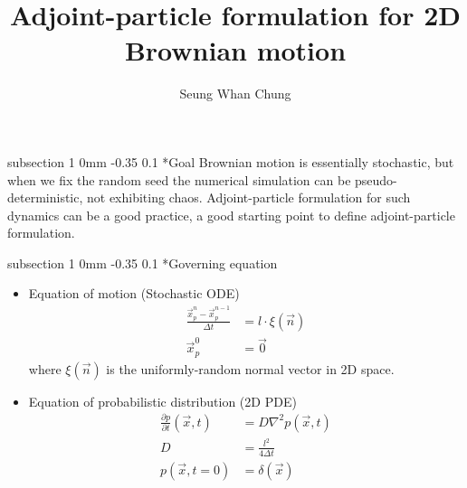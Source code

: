 \documentclass[11pt]{article}
\title{Adjoint-particle formulation for 2D Brownian motion}
\author{Seung Whan Chung}
\makeatletter
\renewcommand{\subsection}{\@startsection
{subsection}%
{1}%
{0mm}%
{-0.35\baselineskip}%
{0.1\baselineskip}%
{\normalfont\large\bfseries\color{brown}}}%
\def\Dpartial#1#2{ \frac{\partial #1}{\partial #2} }
\newcommand{\vn}{\vec{n}}
\newcommand{\vx}{\vec{x}}
\newcommand{\xp}{\vec{x}_p}
\newcommand{\Dt}{\Delta t}
\makeatother
\begin{document}
\maketitle

\subsection*{Goal}
Brownian motion is essentially stochastic, but when we fix the random seed the numerical simulation can be pseudo-deterministic, not exhibiting chaos.
Adjoint-particle formulation for such dynamics can be a good practice, a good starting point to define adjoint-particle formulation.

\subsection*{Governing equation}
\begin{itemize}
\item Equation of motion (Stochastic ODE)
\begin{equation}
\begin{split}
\frac{\xp^n - \xp^{n-1}}{\Dt} &= l\cdot\xi(\vn)\\
\xp^0 &= \vec{0}
\end{split}
\end{equation}
where $\xi(\vn)$ is the uniformly-random normal vector in 2D space.
\item Equation of probabilistic distribution (2D PDE)
\begin{equation}
\begin{split}
\Dpartial{p}{t}(\vx,t) &= D\nabla^2p(\vx,t)\\
D &= \frac{l^2}{4\Dt}\\
p(\vx,t=0) &= \delta(\vx)
\end{split}
\end{equation}
\end{itemize}
\end{document}
